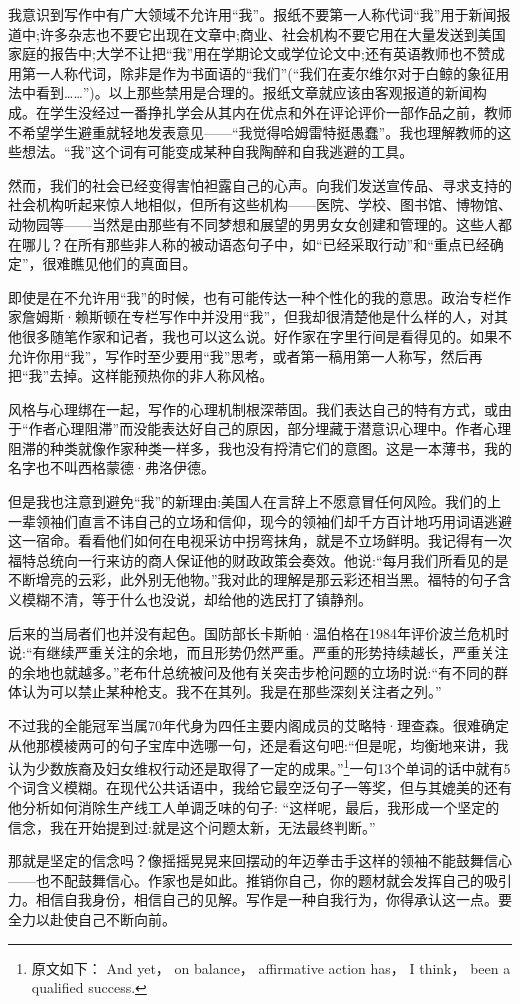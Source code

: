 我意识到写作中有广大领域不允许用“我”。报纸不要第一人称代词“我”用于新闻报道中;许多杂志也不要它出现在文章中;商业、社会机构不要它用在大量发送到美国家庭的报告中;大学不让把“我”用在学期论文或学位论文中;还有英语教师也不赞成用第一人称代词，除非是作为书面语的“我们”(“我们在麦尔维尔对于白鲸的象征用法中看到……”)。以上那些禁用是合理的。报纸文章就应该由客观报道的新闻构成。在学生没经过一番挣扎学会从其内在优点和外在评论评价一部作品之前，教师不希望学生避重就轻地发表意见——“我觉得哈姆雷特挺愚蠢”。我也理解教师的这些想法。“我”这个词有可能变成某种自我陶醉和自我逃避的工具。

然而，我们的社会已经变得害怕袒露自己的心声。向我们发送宣传品、寻求支持的社会机构听起来惊人地相似，但所有这些机构——医院、学校、图书馆、博物馆、动物园等——当然是由那些有不同梦想和展望的男男女女创建和管理的。这些人都在哪儿？在所有那些非人称的被动语态句子中，如“已经采取行动”和“重点已经确定”，很难瞧见他们的真面目。

即使是在不允许用“我”的时候，也有可能传达一种个性化的我的意思。政治专栏作家詹姆斯·赖斯顿在专栏写作中并没用“我”，但我却很清楚他是什么样的人，对其他很多随笔作家和记者，我也可以这么说。好作家在字里行间是看得见的。如果不允许你用“我”，写作时至少要用“我”思考，或者第一稿用第一人称写，然后再把“我”去掉。这样能预热你的非人称风格。

风格与心理绑在一起，写作的心理机制根深蒂固。我们表达自己的特有方式，或由于“作者心理阻滞”而没能表达好自己的原因，部分埋藏于潜意识心理中。作者心理阻滞的种类就像作家种类一样多，我也没有捋清它们的意图。这是一本薄书，我的名字也不叫西格蒙德·弗洛伊德。

但是我也注意到避免“我”的新理由:美国人在言辞上不愿意冒任何风险。我们的上一辈领袖们直言不讳自己的立场和信仰，现今的领袖们却千方百计地巧用词语逃避这一宿命。看看他们如何在电视采访中拐弯抹角，就是不立场鲜明。我记得有一次福特总统向一行来访的商人保证他的财政政策会奏效。他说:“每月我们所看见的是不断增亮的云彩，此外别无他物。”我对此的理解是那云彩还相当黑。福特的句子含义模糊不清，等于什么也没说，却给他的选民打了镇静剂。

后来的当局者们也并没有起色。国防部长卡斯帕·温伯格在1984年评价波兰危机时说:“有继续严重关注的余地，而且形势仍然严重。严重的形势持续越长，严重关注的余地也就越多。”老布什总统被问及他有关突击步枪问题的立场时说:“有不同的群体认为可以禁止某种枪支。我不在其列。我是在那些深刻关注者之列。”

不过我的全能冠军当属70年代身为四任主要内阁成员的艾略特·理查森。很难确定从他那模棱两可的句子宝库中选哪一句，还是看这句吧:“但是呢，均衡地来讲，我认为少数族裔及妇女维权行动还是取得了一定的成果。”\footnote{原文如下： And yet， on balance， affirmative action has， I think， been a qualified success.}一句13个单词的话中就有5个词含义模糊。在现代公共话语中，我给它最空泛句子一等奖，但与其媲美的还有他分析如何消除生产线工人单调乏味的句子: “这样呢，最后，我形成一个坚定的信念，我在开始提到过:就是这个问题太新，无法最终判断。”


那就是坚定的信念吗？像摇摇晃晃来回摆动的年迈拳击手这样的领袖不能鼓舞信心——也不配鼓舞信心。作家也是如此。推销你自己，你的题材就会发挥自己的吸引力。相信自我身份，相信自己的见解。写作是一种自我行为，你得承认这一点。要全力以赴使自己不断向前。